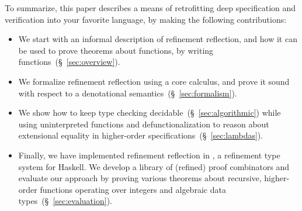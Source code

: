 To summarize, this paper describes a means of
retrofitting deep specification and verification
into your favorite language, by making the
following contributions:
%
\begin{itemize}
\item We start with an informal description of
      refinement reflection, and how it can
      be used to prove theorems about functions,
      by writing functions~(\S~\ref{sec:overview}).

\item We formalize refinement reflection using
      a core calculus, and prove it sound with
      respect to a denotational
      semantics~(\S~\ref{sec:formalism}).

\item We show how to keep type checking
      decidable~(\S~\ref{sec:algorithmic})
      while using uninterpreted functions and
      defunctionalization to reason about
      extensional equality in higher-order
      specifications~(\S~\ref{sec:lambdas}).

\item Finally, we have implemented refinement reflection
      in \toolname, a refinement type system for Haskell.
      We develop a library of (refined) proof combinators
      and evaluate our approach by proving various theorems
      about recursive, higher-order functions operating over
      integers and algebraic data types~(\S~\ref{sec:evaluation}).
\end{itemize}
